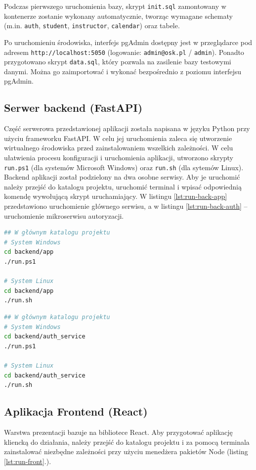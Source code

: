 \documentclass[12pt,twoside]{article}
\begin{document}
Podczas pierwszego uruchomienia bazy, skrypt \texttt{init.sql} zamontowany w kontenerze zostanie wykonany automatycznie, tworząc wymagane schematy (m.in. \texttt{auth}, \texttt{student}, \texttt{instructor}, \texttt{calendar}) oraz tabele. 

Po uruchomieniu środowiska, interfejs pgAdmin dostępny jest w przeglądarce pod adresem \texttt{http://localhost:5050} (logowanie: \texttt{admin@osk.pl} / \texttt{admin}). Ponadto przygotowano skrypt \texttt{data.sql}, który pozwala na zasilenie bazy testowymi danymi. Można go zaimportować i wykonać bezpośrednio z poziomu interfejsu pgAdmin.

\subsection{Serwer backend (FastAPI)}
Część serwerowa przedstawionej aplikacji została napisana w języku Python przy użyciu frameworku FastAPI. W celu jej uruchomienia zaleca się utworzenie wirtualnego środowiska przed zainstalowaniem wszelkich zależności. W celu ułatwienia procesu konfiguracji i uruchomienia aplikacji, utworzono skrypty \texttt{run.ps1} (dla systemów Microsoft Windows) oraz \texttt{run.sh} (dla sytemów Linux). Backend aplikacji został podzielony na dwa osobne serwisy. Aby je uruchomić należy przejść do katalogu projektu, uruchomić terminal i wpisać odpowiednią komendę wywołującą skrypt uruchamiający. W listingu \ref{lst:run-back-app} przedstawiono uruchomienie głównego serwisu, a w listingu \ref{lst:run-back-auth} -- uruchomienie mikroserwisu autoryzacji.
\begin{lstlisting}[language=bash, caption={Inicjalizacja i uruchomienie serwera backendowego -- serwis główny}, label={lst:run-back-app}]
## W głównym katalogu projektu
# System Windows
cd backend/app
./run.ps1

# System Linux
cd backend/app
./run.sh
\end{lstlisting}

\begin{lstlisting}[language=bash, caption={Inicjalizacja i uruchomienie serwera backendowego -- mikroserwis autoryzacji}, label={lst:run-back-auth}]
## W głównym katalogu projektu
# System Windows
cd backend/auth_service
./run.ps1

# System Linux
cd backend/auth_service
./run.sh
\end{lstlisting}

\subsection{Aplikacja Frontend (React)}
Warstwa prezentacji bazuje na bibliotece React. Aby przygotować aplikację kliencką do działania, należy przejść do katalogu projektu i za pomocą terminala zainstalować niezbędne zależności przy użyciu menedżera pakietów Node (listing \ref{lst:run-front}.).
\end{document}
